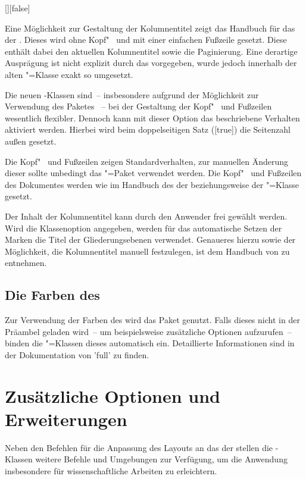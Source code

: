 \begin{Declaration}{[\PBoolean]}[false]%
\printdeclarationlist%
%

Eine Möglichkeit zur Gestaltung der Kolumnentitel zeigt das Handbuch für das 
\CD der \TnUD. Dieses wird ohne Kopf"~ und mit einer einfachen Fußzeile 
gesetzt. Diese enthält dabei den aktuellen Kolumnentitel sowie die Paginierung. 
Eine derartige Ausprägung ist nicht explizit durch das \CD vorgegeben, wurde 
jedoch innerhalb der alten "=Klasse exakt so umgesetzt.

Die neuen \TUDScript-Klassen sind~-- insbesondere aufgrund der Möglichkeit zur 
Verwendung des Paketes ~-- bei der Gestaltung der 
Kopf"~ und Fußzeilen wesentlich flexibler. Dennoch kann mit dieser Option das 
beschriebene Verhalten aktiviert werden. Hierbei wird beim doppelseitigen Satz 
([true]) die Seitenzahl außen gesetzt.
%
\begin{values}
\itemfalse
  Die Kopf"~ und Fußzeilen zeigen Standardverhalten, zur manuellen Änderung 
  dieser sollte unbedingt das \KOMAScript"=Paket  
  verwendet werden.
\itemtrue*
  Die Kopf"~ und Fußzeilen des Dokumentes werden wie im Handbuch des \CDs der 
  \TnUD beziehungsweise der "=Klasse gesetzt.
\end{values}
%
Der Inhalt der Kolumnentitel kann durch den Anwender frei gewählt werden. Wird 
die Klassenoption  angegeben, werden für das automatische 
Setzen der Marken die Titel der Gliederungsebenen verwendet. Genaueres hierzu 
sowie der Möglichkeit, die Kolumnentitel manuell festzulegen, ist dem Handbuch 
von \KOMAScript{} zu entnehmen.
\end{Declaration}


\subsection{Die Farben des \CDs}
%
% 
Zur Verwendung der Farben des \CDs wird das Paket  
genutzt. Falls dieses nicht in der Präambel geladen wird~-- um beispielsweise 
zusätzliche Optionen aufzurufen~-- binden die \TUDScript"=Klassen dieses 
automatisch ein. Detaillierte Informationen sind in der Dokumentation von 
'full' zu finden.



\section{Zusätzliche Optionen und Erweiterungen}
Neben den Befehlen für die Anpassung des Layouts an das \CD der \TnUD stellen 
die \TUDScript-Klassen weitere Befehle und Umgebungen zur Verfügung, um die 
Anwendung insbesondere für wissenschaftliche Arbeiten zu erleichtern.


